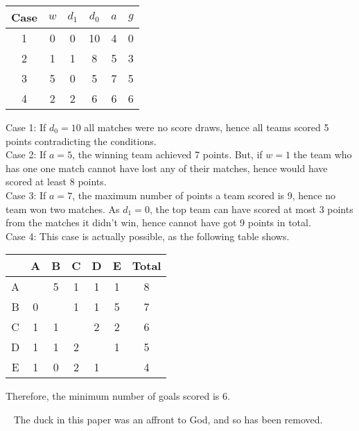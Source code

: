 \documentclass{article}
\begin{document}
\begin{enumerate}[1.]
\begin{table}[ht!]
	\begin{center}
	  \begin{tabular}{ | c | c | c | c | c | c |}
		  \hline
		  Case &  $w$ & $d_1$ & $d_0$ & $a$ & $g$ \\
		  \hline  
		  1 & 0 & 0 & 10 & 4 & 0 \\
		  \hline  
		  2 & 1 & 1 &  8 & 5 & 3 \\
		  \hline  
		  3 & 5 & 0 &  5 & 7 & 5 \\
		  \hline
		  4 & 2 & 2 &  6 & 6 & 6\\
		  \hline  
	  \end{tabular}
	\end{center}
\end{table}

Case 1: If $d_0 = 10$ all matches were no score draws, hence all teams scored 5 points contradicting the conditions.\\
Case 2: If $a = 5$, the winning team achieved 7 points. But, if $w = 1$ the team who has one one match cannot have lost any of their matches, hence would have scored at least 8 points.\\
Case 3: If $a = 7$, the maximum number of points a team scored is 9, hence no team won two matches. As $d_1 = 0$, the top team can have scored at most 3 points from the matches it didn't win, hence cannot have got 9 points in total.\\
Case 4: This case is actually possible, as the following table shows.
\begin{table}[ht!]
	\begin{center}
	  \begin{tabular}{ | c | c | c | c | c | c | c |}
		  \hline
		    & A & B & C & D & E & Total\\
		  \hline  
		  A &   & 5 & 1 & 1 & 1 & 8\\
		  \hline  
		  B & 0 &   & 1 & 1 & 5 & 7\\
		  \hline  
		  C & 1 & 1 &   & 2 & 2 & 6\\
		  \hline  
		  D & 1 & 1 & 2 &   & 1 & 5\\
		  \hline  
		  E & 1 & 0 & 2 & 1 &   & 4\\
		  \hline  
	  \end{tabular}
	\end{center}
\end{table}

Therefore, the minimum number of goals scored is 6.

\end{enumerate}


\clearpage
~
\vfill
\centering
The duck in this paper was an affront to God, and so has been removed.
\vfill
\end{document}
